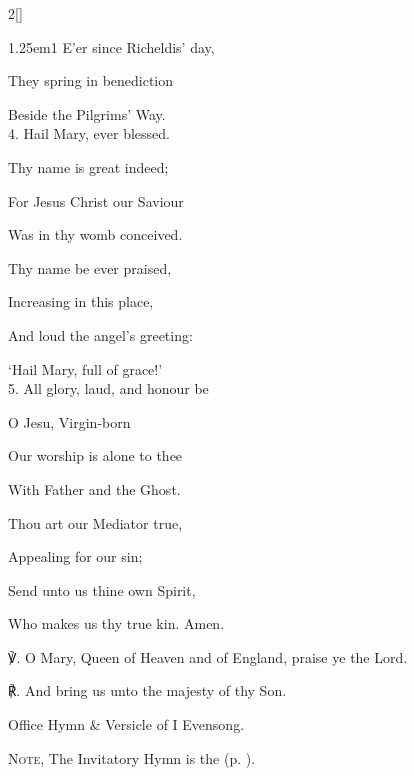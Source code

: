 \begin{paracol}{2}[]
\begin{hangparas}{1.25em}{1}
E’er since Richeldis' day,

They spring in benediction

Beside the Pilgrims' Way.\\

4. Hail Mary, ever blessed.

Thy name is great indeed;

For Jesus Christ our Saviour

Was in thy womb conceived.

Thy name be ever praised,

Increasing in this place,

And loud the angel's greeting:

`Hail Mary, full of grace!'\\

5. All glory, laud, and honour be

O Jesu, Virgin-born

Our worship is alone to thee

With Father and the Ghost.

Thou art our Mediator true,

Appealing for our sin;

Send unto us thine own Spirit,

Who makes us thy true kin. Amen.\\
\end{hangparas}

    ℣. O Mary, Queen of Heaven and of England, praise ye the Lord.

	℟. And bring us unto the majesty of thy Son.
	


\secondEvensong

\begin{rubric}
	Office Hymn \& Versicle of I Evensong.
\end{rubric}


\switchcolumn

\mattins

\begin{rubric}
		\textsc{Note,} The Invitatory Hymn is the  (p. \pageref{SalveRegina}).
\end{rubric}

\mattinsOfficeHymn


\end{paracol}
